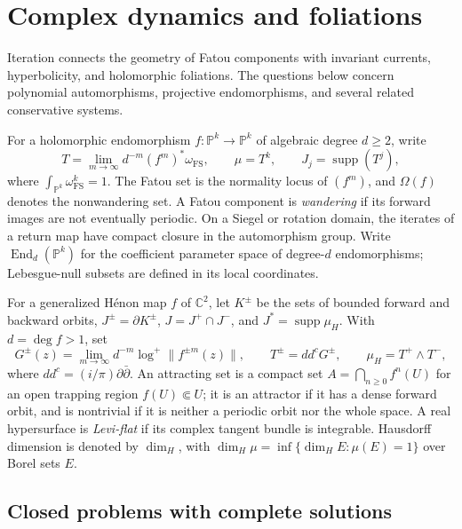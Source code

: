 \documentclass[11pt,reqno]{amsart}
\theoremstyle{definition}
\theoremstyle{remark}
\begin{document}
\section{Complex dynamics and foliations}

Iteration connects the geometry of Fatou components with invariant currents, hyperbolicity, and holomorphic foliations. The questions below concern polynomial automorphisms, projective endomorphisms, and several related conservative systems.

For a holomorphic endomorphism $f:\mathbb P^k\to\mathbb P^k$ of algebraic degree $d\geq2$, write
\[
 T=\lim_{m\to\infty}d^{-m}(f^m)^*\omega_{\mathrm{FS}},\qquad
 \mu=T^k,\qquad J_j=\operatorname{supp}(T^j),
\]
where $\int_{\mathbb P^k}\omega_{\mathrm{FS}}^k=1$. The Fatou set is the normality locus of $(f^m)$, and $\Omega(f)$ denotes the nonwandering set. A Fatou component is \emph{wandering} if its forward images are not eventually periodic. On a Siegel or rotation domain, the iterates of a return map have compact closure in the automorphism group. Write $\operatorname{End}_d(\mathbb P^k)$ for the coefficient parameter space of degree-$d$ endomorphisms; Lebesgue-null subsets are defined in its local coordinates.

For a generalized H\'enon map $f$ of $\mathbb C^2$, let $K^\pm$ be the sets of bounded forward and backward orbits, $J^\pm=\partial K^\pm$, $J=J^+\cap J^-$, and $J^*=\operatorname{supp}\mu_H$. With $d=\deg f>1$, set
\[
 G^\pm(z)=\lim_{m\to\infty}d^{-m}\log^+\|f^{\pm m}(z)\|,
 \qquad T^\pm=dd^cG^\pm,\qquad \mu_H=T^+\wedge T^-,
\]
where $dd^c=(i/\pi)\partial\bar\partial$.
An attracting set is a compact set $A=\bigcap_{n\geq0}f^n(U)$ for an open trapping region $f(U)\Subset U$; it is an attractor if it has a dense forward orbit, and is nontrivial if it is neither a periodic orbit nor the whole space. A real hypersurface is \emph{Levi-flat} if its complex tangent bundle is integrable. Hausdorff dimension is denoted by $\dim_H$, with $\dim_H\mu=\inf\{\dim_HE:\mu(E)=1\}$ over Borel sets $E$.

\subsection{Closed problems with complete solutions}
\end{document}
